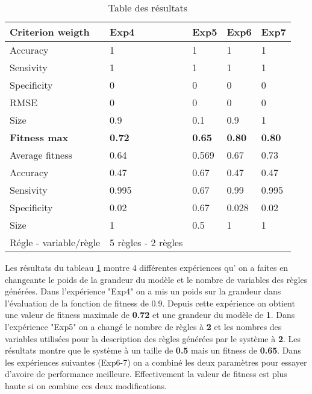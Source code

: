  
 
\begin{table}[h]
\centering

\label{my-label}
\begin{tabular}{|l|l|l|l|l|}
\hline
\textbf{Criterion weigth} & \textbf{Exp4} & \textbf{Exp5} & \textbf{Exp6} & \textbf{Exp7} \\ \hline
Accuracy                 & 1             & 1             & 1             & 1             \\ \hline
Sensivity                & 1             & 1             & 1             & 1             \\ \hline
Specificity              & 0             & 0             & 0             & 0             \\ \hline
RMSE                     & 0             & 0             & 0             & 0             \\ \hline
Size                     & 0.9           & 0.1           & 0.9           & 1             \\ \hline
\textbf{Fitness max}     & \textbf{0.72} & \textbf{0.65} & \textbf{0.80} & \textbf{0.80} \\ \hline
Average fitness          & 0.64          & 0.569         & 0.67          & 0.73          \\ \hline
Accuracy                 & 0.47          & 0.67          & 0.47          & 0.47          \\ \hline
Sensivity                & 0.995         & 0.67          & 0.99          & 0.995         \\ \hline
Specificity              & 0.02          & 0.67          & 0.028         & 0.02          \\ \hline
Size                     & 1             & 0.5           & 1             & 1             \\ \hline
Régle - variable/règle  & 5 règles - 2 règles      &        &               &               \\ \hline
\end{tabular}
\caption{\label{table4}Table des résultats}
\end{table}

Les résultats du tableau \ref{table4}  montre 4 différentes expériences qu’ on a faites en changeante le poids de la grandeur du modèle et le nombre de variables des règles générées. Dans l'expérience "Exp4" on a mis un poids sur la grandeur dans l'évaluation de la fonction de fitness de 0.9. Depuis cette expérience on obtient une valeur de fitness maximale de  \textbf{0.72} et une grandeur du modèle de \textbf{1}. Dans l'expérience "Exp5" on a changé le nombre de règles à \textbf{2} et les nombres des  variables utilisées pour la description des règles générées par le système à \textbf{2}. Les résultats montre que le système à un taille de \textbf{0.5} mais un fitness de \textbf{0.65}.
Dans les expériences suivantes (Exp6-7) on a combiné les deux paramètres pour essayer d'avoire de performance meilleure. Effectivement la valeur de fitness est plus haute si on combine ces deux modifications.





 
 
 
 

